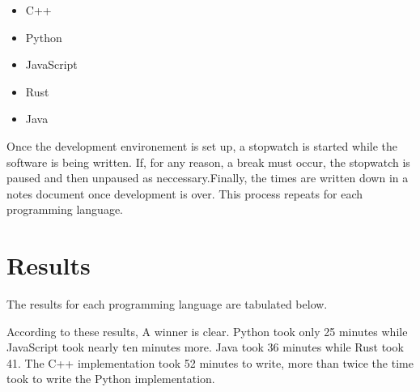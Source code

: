 \documentclass{article}
\begin{document}
\begin{itemize}
        \item C++
        \item Python
        \item JavaScript
        \item Rust
        \item Java
\end{itemize}

Once the development environement is set up, a stopwatch is started while the software is being written. If, for any reason, a break must occur, the stopwatch is paused and then unpaused as neccessary.Finally, the times are written down in a notes document once development is over. This process repeats for each programming language. 

\section{Results}

The results for each programming language are tabulated below.
\begin{center}
\begin{adjustbox}{center}
\end{adjustbox}
\end{center}

According to these results, A winner is clear. Python took only 25 minutes while JavaScript took nearly ten minutes more. Java took 36 minutes while Rust took 41. The C++ implementation took 52 minutes to write, more than twice the time took to write the Python implementation.
\end{document}
